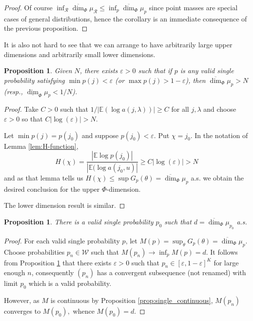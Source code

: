 \documentclass{amsart}
\newtheorem{proposition}[theorem]{Proposition}
\theoremstyle{plain}
\numberwithin{equation}{section}
\newcommand{\cR}{{\mathcal R}}
\newcommand{\cW}{{\mathcal W}}
\newcommand{\ee}{{\mathbb E}}
\newcommand{\odim}{\overline{\dim}}
\newcommand{\udim}{\underline{\dim}}
\begin{document}
\begin{proof}
Of course $\inf_{\cR} \odim_\Phi \mu_\cR \le \inf_p \odim_\Phi \mu_p$ since point masses are special cases of general
distributions, hence the corollary is an immediate consequence of the previous proposition.
\end{proof}

It is also not hard to see that we can arrange to have arbitrarily large upper dimensions and arbitrarily small lower dimensions.






\begin{proposition}
\label{prop:approachzeroandinfinity}
Given $N$, there exists $\varepsilon >0$ such that if $p$ is any valid
single probability satisfying $\min p(j)<\varepsilon$ (or $\max p(j)>1-\varepsilon$), 
then $\odim_\Phi \mu_p > N$ (resp., $\udim_\Phi \mu_p<1/N$).
\end{proposition}

\begin{proof}
Take $C>0$ such that $1/| \ee (\log a(j,\lambda))| \geq C$ for all 
$j,\lambda $ and choose $\varepsilon >0$ so
that $C|\log (\varepsilon )|>N$.

Let $\min p(j)=p(j_{0})$ and suppose $p(j_{0})<\varepsilon$. 
Put $\chi=j_{0}$. 
In the notation of Lemma \ref{lem:H-function}, 
\begin{equation*}
   H(\chi )=\frac{|\ee \log p(j_{0})|}{|\ee (\log a(j_{0},u)|}\geq
    C|\log (\varepsilon )|>N
\end{equation*}%
and as that lemma tells us $H(\chi )\leq \sup G_{p}(\theta )=\odim_\Phi \mu _{p}$ 
a.s. we obtain the desired conclusion for the upper $\Phi$-dimension.

The lower dimension result is similar. 
\end{proof}


\begin{proposition} \label{prop:min_single}
There is a valid single probability $p_{0}$ such that $d=\odim_{\Phi}\mu_{p_{0}}$ a.s.
\end{proposition}

\begin{proof}
For each valid single probability $p$, let $M(p)=\sup_{\theta}G_{p}(\theta) = \odim_\Phi \mu_p$. 
Choose probabilities $p_{n} \in \cW$ such that $M(p_{n})\rightarrow \inf_p M(p)=d$. 
It follows from Proposition \ref{prop:approachzeroandinfinity} that there exists $\varepsilon >0$ such that 
$p_{n}\in [\varepsilon ,1-\varepsilon ]^K$ for large enough $n$,  consequently $(p_{n})$ has a
convergent subsequence (not renamed) with limit $p_{0}$ which is a valid probability.

However, as $M$ is continuous by Proposition \ref{prop:single_continuous}, $M(p_{n})$ converges to $M(p_{0}),$ whence $M(p_{0})=d$.
\end{proof}
\end{document}
